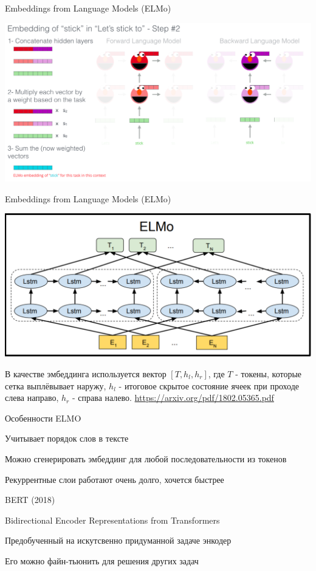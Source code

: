 \documentclass[notes,12pt, aspectratio=169]{beamer}
\newenvironment{wideitemize}{\itemize\addtolength{\itemsep}{10pt}}{\enditemize}
\begin{document}
\begin{frame}{ Embeddings from Language Models (ELMo)}
	\begin{center}
		\includegraphics[width=.9\linewidth]{elmo4.png}
	\end{center}
\end{frame}


\begin{frame}{ Embeddings from Language Models (ELMo)}
	\begin{center}
		\includegraphics[width=.6\linewidth]{ elmo.png}
	\end{center}
	В качестве эмбеддинга используется вектор $[𝑇 , h_𝑙, h_𝑟]$, где $𝑇$ - токены, которые сетка выплёвывает наружу, $h_𝑙$ - итоговое скрытое состояние ячеек при проходе слева направо, $h_𝑟$ - справа налево.
	\vfill
	\footnotesize
	{\color{blue} \url{https://arxiv.org/pdf/1802.05365.pdf}  } 
\end{frame}


\begin{frame}{Особенности ELMO}
	\begin{wideitemize}
		\item  Учитывает порядок слов в тексте
		\item  Можно сгенерировать эмбеддинг для любой последовательности из токенов
		\item  Рекуррентные слои работают очень долго, хочется быстрее
	\end{wideitemize}
\end{frame}


\begin{frame}{BERT (2018)}
	\begin{wideitemize}
		\item  \alert{Bidirectional Encoder Representations from Transformers} 
		\item Предобученный на искутсвенно придуманной задаче  энкодер
		\item Его можно файн-тьюнить для решения других задач 
	\end{wideitemize}
\end{frame}
\end{document}
